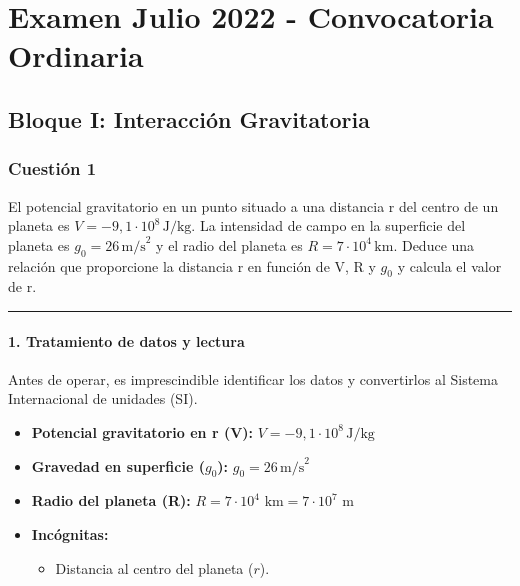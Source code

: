 \chapter{Examen Julio 2022 - Convocatoria Ordinaria}
\label{chap:2022_jul_ord}

\section{Bloque I: Interacción Gravitatoria}
\label{sec:grav_2022_jul_ord}

\subsection{Cuestión 1}
\label{subsec:C1_2022_jul_ord}

\begin{cajaenunciado}
El potencial gravitatorio en un punto situado a una distancia r del centro de un planeta es $V=-9,1\cdot10^{8}\,\text{J/kg}$. La intensidad de campo en la superficie del planeta es $g_{0}=26\,\text{m/s}^2$ y el radio del planeta es $R=7\cdot10^{4}\,\text{km}$. Deduce una relación que proporcione la distancia r en función de V, R y $g_0$ y calcula el valor de r.
\end{cajaenunciado}
\hrule

\subsubsection*{1. Tratamiento de datos y lectura}
Antes de operar, es imprescindible identificar los datos y convertirlos al Sistema Internacional de unidades (SI).
\begin{itemize}
    \item \textbf{Potencial gravitatorio en r (V):} $V = -9,1 \cdot 10^8 \, \text{J/kg}$
    \item \textbf{Gravedad en superficie ($g_0$):} $g_0 = 26 \, \text{m/s}^2$
    \item \textbf{Radio del planeta (R):} $R = 7 \cdot 10^4 \text{ km} = 7 \cdot 10^7 \text{ m}$
    \item \textbf{Incógnitas:}
    \begin{itemize}
        \item Distancia al centro del planeta ($r$).
    \end{itemize}
\end{itemize}

